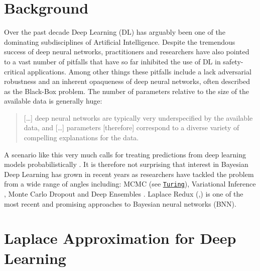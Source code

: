 \documentclass[
  letterpaper,
  DIV=11,
  numbers=noendperiod]{scrartcl}
\author{}
\date{}
\begin{document}
\ifdefined\Shaded\renewenvironment{Shaded}{\begin{tcolorbox}[interior hidden, frame hidden, boxrule=0pt, borderline west={3pt}{0pt}{shadecolor}, breakable, sharp corners, enhanced]}{\end{tcolorbox}}\fi

\hypertarget{sec-intro}{%
\section{Background}\label{sec-intro}}

Over the past decade Deep Learning (DL) has arguably been one of the
dominating subdisciplines of Artificial Intelligence. Despite the
tremendous success of deep neural networks, practitioners and
researchers have also pointed to a vast number of pitfalls that have so
far inhibited the use of DL in safety-critical applications. Among other
things these pitfalls include a lack adversarial robustness
\cite{goodfellow2014explaining} and an inherent opaqueness of deep
neural networks, often described as the Black-Box problem. The number of
parameters relative to the size of the available data is generally huge:

\begin{quote}
{[}\ldots{]} deep neural networks are typically very underspecified by
the available data, and {[}\ldots{]} parameters {[}therefore{]}
correspond to a diverse variety of compelling explanations for the data.
\cite{wilson2020case}
\end{quote}

A scenario like this very much calls for treating predictions from deep
learning models probabilistically \cite{wilson2020case}. It is therefore
not surprising that interest in Bayesian Deep Learning has grown in
recent years as researchers have tackled the problem from a wide range
of angles including: MCMC (see
\href{https://turing.ml/dev/tutorials/03-bayesian-neural-network/}{\texttt{Turing}}),
Variational Inference \cite{blundell2015weight}, Monte Carlo Dropout
\cite{gal2016dropout} and Deep Ensembles
\cite{lakshminarayanan2016simple}. Laplace Redux
(\cite{immer2020improving},\cite{daxberger2021laplace}) is one of the
most recent and promising approaches to Bayesian neural networks (BNN).

\hypertarget{sec-body}{%
\section{Laplace Approximation for Deep Learning}\label{sec-body}}
\end{document}
